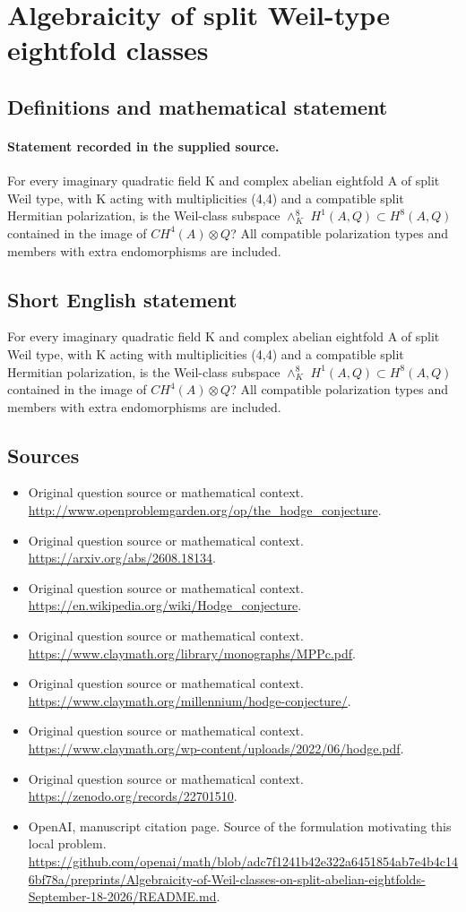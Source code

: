 \documentclass[11pt]{article}
\begin{document}
\section*{Algebraicity of split Weil-type eightfold classes}\label{statement}
\subsection{Definitions and mathematical statement}
\paragraph{Statement recorded in the supplied source.}
For every imaginary quadratic field K and complex abelian eightfold A of split Weil type, with K acting with multiplicities (4,4) and a compatible split Hermitian polarization, is the Weil-class subspace $\wedge ^{8}_K$ $H^{1}(A,Q)\subset H^{8}(A,Q)$ contained in the image of $CH^{4}(A)\otimes Q$? All compatible polarization types and members with extra endomorphisms are included.
\subsection{Short English statement}
For every imaginary quadratic field K and complex abelian eightfold A of split Weil type, with K acting with multiplicities (4,4) and a compatible split Hermitian polarization, is the Weil-class subspace $\wedge ^{8}_K$ $H^{1}(A,Q)\subset H^{8}(A,Q)$ contained in the image of $CH^{4}(A)\otimes Q$? All compatible polarization types and members with extra endomorphisms are included.
\subsection{Sources}
\begin{itemize}
\item[S1] Original question source or mathematical context.
\url{http://www.openproblemgarden.org/op/the_hodge_conjecture}.
\item[S2] Original question source or mathematical context.
\url{https://arxiv.org/abs/2608.18134}.
\item[S3] Original question source or mathematical context.
\url{https://en.wikipedia.org/wiki/Hodge_conjecture}.
\item[S4] Original question source or mathematical context.
\url{https://www.claymath.org/library/monographs/MPPc.pdf}.
\item[S5] Original question source or mathematical context.
\url{https://www.claymath.org/millennium/hodge-conjecture/}.
\item[S6] Original question source or mathematical context.
\url{https://www.claymath.org/wp-content/uploads/2022/06/hodge.pdf}.
\item[S7] Original question source or mathematical context.
\url{https://zenodo.org/records/22701510}.
\item[S8] OpenAI, manuscript citation page. Source of the formulation motivating this local problem.
\url{https://github.com/openai/math/blob/adc7f1241b42e322a6451854ab7e4b4c146bf78a/preprints/Algebraicity-of-Weil-classes-on-split-abelian-eightfolds-September-18-2026/README.md}.
\end{itemize}
\end{document}
